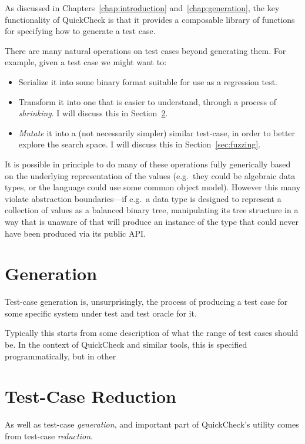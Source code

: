 As discussed in Chapters~\ref{chap:introduction} and~\ref{chap:generation},
the key functionality of QuickCheck is that it provides a composable library of functions for specifying how to generate a test case.

There are many natural operations on test cases beyond generating them.
For example,
given a test case we might want to:

\begin{itemize}
\item Serialize it into some binary format suitable for use as a regression test.
\item Transform it into one that is easier to understand,
through a process of \emph{shrinking}.
I will discuss this in Section~\ref{sec:shrinking}.
\item \emph{Mutate} it into a (not necessarily simpler) similar test-case,
in order to better explore the search space. I will discuss this in Section~\ref{sec:fuzzing}.
\end{itemize}

It is possible in principle to do many of these operations fully generically based on the underlying representation of the values (e.g.~they could be algebraic data types,
or the language could use some common object model).
However this many violate abstraction boundaries---if
e.g.\ a data type is designed to represent a collection of values as a balanced binary tree,
manipulating its tree structure in a way that is unaware of that will produce an instance of the type that could never have been produced via its public API.\ 

\section{Generation}

Test-case generation is,
unsurprisingly,
the process of producing a test case for some specific system under test and test oracle for it.

Typically this starts from some description of what the range of test cases should be.
In the context of QuickCheck and similar tools,
this is specified programmatically,
but in other

\section{Test-Case Reduction}\label{sec:shrinking}

As well as test-case \emph{generation},
and important part of QuickCheck's utility comes from test-case \emph{reduction}.

